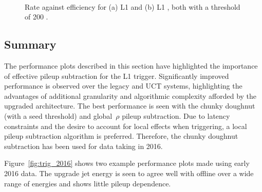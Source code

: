 \begin{figure}
\centering
	~
	\caption{Rate against efficiency for (a) L1 \scalht and (b) L1 \mht, both with a
	threshold of 200 \GeV.}
	    \label{fig:rate_eff_sum}
\end{figure}

\subsection{Summary}

The performance plots described in this section have highlighted the importance of effective
pileup subtraction for the L1 trigger. Significantly improved performance is observed over 
the legacy and UCT systems, highlighting the advantages of additional granularity
and algorithmic complexity afforded by the upgraded architecture.
The best performance is seen with the chunky doughnut (with a seed threshold) 
and global~$\rho$ pileup subtraction. Due to latency constraints and the desire to account for 
local effects when triggering, a local pileup subtraction algorithm is preferred. 
Therefore, the chunky doughnut subtraction has been used for data taking in 2016.

Figure~\ref{fig:trig_2016} shows two example performance plots made using early 2016 data. 
The upgrade jet energy is seen to agree well with offline over a wide range of energies 
and shows little pileup dependence.


